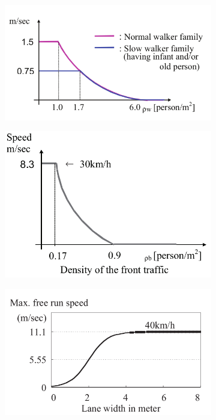 \begin{figure}[ht]
    \centering
    \begin{subfigure}{0.4\textwidth}
        \includegraphics[width=\textwidth]{images/speed_GOTO.png}
        \caption{}
        \label{fig:goto-ped}
    \end{subfigure}
    \begin{subfigure}{0.4\textwidth}
        \includegraphics[width=\textwidth]{images/speed_GOTO_motocicli.png}
        \caption{}
        \label{fig:goto-moto}
    \end{subfigure}
    \begin{subfigure}{0.4\textwidth}
        \includegraphics[width=\textwidth]{images/speed_GOTO_auto.png}

\end{subfigure}
\end{figure}
